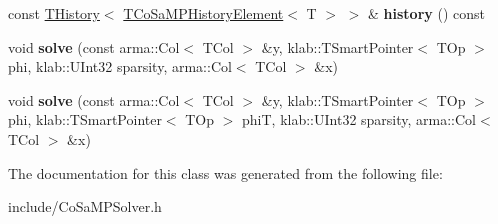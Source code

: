 \begin{DoxyCompactItemize}
\item 
const \hyperlink{classkl1p_1_1THistory}{T\+History}$<$ \hyperlink{classkl1p_1_1TCoSaMPHistoryElement}{T\+Co\+Sa\+M\+P\+History\+Element}$<$ T $>$ $>$ \& {\bfseries history} () const \hypertarget{classkl1p_1_1TCoSaMPSolver_ae63f0b6750a4d2905c4d3a48c35d33e4}{}\label{classkl1p_1_1TCoSaMPSolver_ae63f0b6750a4d2905c4d3a48c35d33e4}

\item 
void {\bfseries solve} (const arma\+::\+Col$<$ T\+Col $>$ \&y, klab\+::\+T\+Smart\+Pointer$<$ T\+Op $>$ phi, klab\+::\+U\+Int32 sparsity, arma\+::\+Col$<$ T\+Col $>$ \&x)\hypertarget{classkl1p_1_1TCoSaMPSolver_aeb947aef9bebf8ce244a9c3b932a20a7}{}\label{classkl1p_1_1TCoSaMPSolver_aeb947aef9bebf8ce244a9c3b932a20a7}

\item 
void {\bfseries solve} (const arma\+::\+Col$<$ T\+Col $>$ \&y, klab\+::\+T\+Smart\+Pointer$<$ T\+Op $>$ phi, klab\+::\+T\+Smart\+Pointer$<$ T\+Op $>$ phiT, klab\+::\+U\+Int32 sparsity, arma\+::\+Col$<$ T\+Col $>$ \&x)\hypertarget{classkl1p_1_1TCoSaMPSolver_afcc889869e6da22c681e5ed06942e851}{}\label{classkl1p_1_1TCoSaMPSolver_afcc889869e6da22c681e5ed06942e851}

\end{DoxyCompactItemize}


The documentation for this class was generated from the following file\+:\begin{DoxyCompactItemize}
\item 
include/Co\+Sa\+M\+P\+Solver.\+h\end{DoxyCompactItemize}
